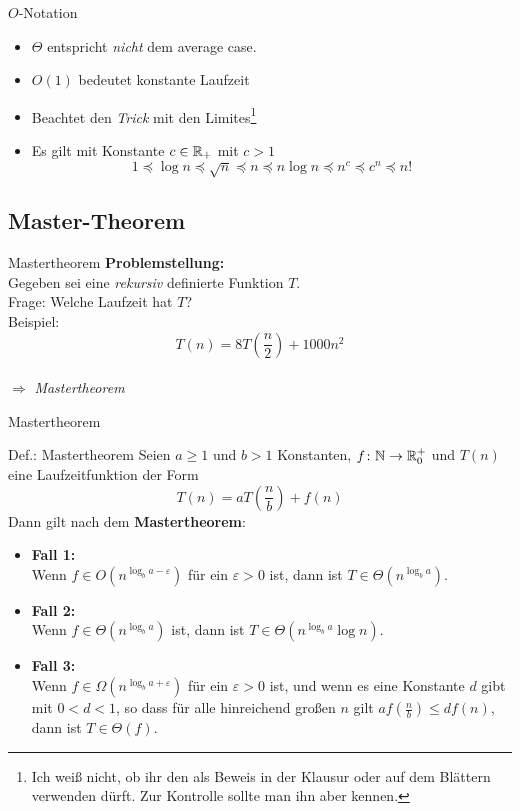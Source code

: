 \begin{frame}{$O$-Notation} %
    \begin{itemize}
    	\item $\Theta$ entspricht \emph{nicht} dem average case.
    	\item $O(1)$ bedeutet konstante Laufzeit
    	\item Beachtet den \emph{Trick} mit den Limites\footnote{Ich weiß nicht, ob ihr den als Beweis in der Klausur oder auf dem Blättern verwenden dürft. Zur Kontrolle sollte man ihn aber kennen.}
        \item Es gilt mit Konstante $c \in \mathbb{R}_+$ mit $c>1$
        \[
            1 \preceq \log n \preceq \sqrt{n} \preceq n \preceq n \log n \preceq n^c \preceq c^n \preceq n!
        \]
    \end{itemize}
\end{frame}

\subsection{Master-Theorem}
\begin{frame}{Mastertheorem}
    \textbf{Problemstellung:}\\[1cm]    
    Gegeben sei eine \emph{rekursiv} definierte Funktion $T$.\\
    Frage: Welche Laufzeit hat $T$?\\[1cm]
    Beispiel:
    \[
    	T(n) = 8 T \left(\frac{n}{2} \right) + 1000n^2
    \]
    \\[1cm]\centering$\Rightarrow$ \emph{Mastertheorem}
\end{frame}

\begin{frame}{Mastertheorem}
    \begin{block}{Def.: Mastertheorem}
    	Seien $a\geq 1$ und $b>1$ Konstanten, $f \colon \mathbb{N} \to \mathbb{R}^+_0$ und $T(n)$ eine Laufzeitfunktion der Form
    	\[
			T(n) = a T\left(\frac{n}{b}\right) + f(n) 
		\]
		Dann gilt nach dem \textbf{Mastertheorem}:
		\begin{itemize}
			\item \textbf{Fall 1:} \\ Wenn $f \in O(n^{\log_b a -\varepsilon})$ für ein $\varepsilon>0$ ist, dann ist $T\in \Theta(n^{\log_b a})$.
			\item \textbf{Fall 2:} \\ Wenn $f \in \Theta(n^{\log_b a})$ ist, dann ist $T\in \Theta(n^{\log_b a}\log n)$.
			\item\textbf{Fall 3:} \\  Wenn $f \in \Omega(n^{\log_b a +\varepsilon})$ für ein $\varepsilon>0$ ist, und wenn es eine Konstante $d$ gibt mit $0<d<1$, so dass für alle hinreichend großen $n$ gilt $af\left(\frac{n}{b}\right)\leq d f(n)$, dann ist $T\in \Theta(f)$.
		\end{itemize}
    \end{block}
\end{frame}

